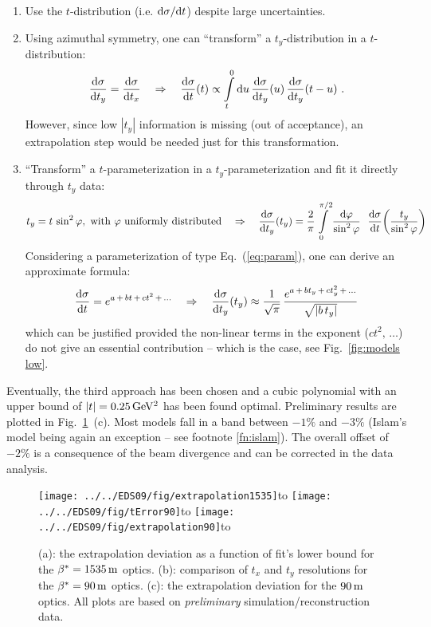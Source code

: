 \documentclass{cimento}
\def\be{\beta}
\def\ph{\varphi}
\def\si{\sigma}
\def\un#1{\,{\rm #1}}
\def\subtitle#1#2{\vbox{\setbox0\hbox{#1}\copy0\hbox to\wd0{\hss#2\hss}}}
\def\d{{\rm d}}
\begin{document}
\begin{enumerate}
\item Use the $t$-distribution (i.e. $\d\si/\d t$) despite large uncertainties.

\item Using azimuthal symmetry, one can ``transform'' a $t_y$-distribution in a $t$-distribution:
$${\d\si\over\d t_y} = {\d\si\over\d t_x} \quad \Rightarrow \quad {\d\si\over\d t}(t) \propto \int\limits_t^0 \d u\, {\d\si\over\d t_y}(u)\, {\d\si\over\d t_y}(t - u)\ .$$
However, since low $|t_y|$ information is missing (out of acceptance), an extrapolation step would be needed just for this transformation.

\item ``Transform'' a $t$-parameterization in a $t_y$-parameterization and fit it directly through $t_y$ data:
$$t_y = t\,\sin^2\ph, \hbox{ with }\ph\hbox{ uniformly distributed} \quad \Rightarrow \quad {\d\si\over\d t_y}(t_y) = {2\over\pi} \int\limits_{0}^{\pi/2} {\d\ph\over\sin^2\ph}\ \ {\d\si\over\d t}\!\left(t_y\over\sin^2\ph\right)$$
Considering a parameterization of type Eq.~(\ref{eq:param}), one can derive an approximate formula:
$${\d\si\over\d t} = e^{a\, +\, bt\, +\, ct^2\, +\, \ldots} \quad\Rightarrow\quad {\d\si\over\d t_y}(t_y) \approx {1\over\sqrt{\pi}}\, {e^{a\, +\, bt_y\, +\, ct_y^2\, +\, \ldots}\over\sqrt{|b\,t_y|}}$$
which can be justified provided the non-linear terms in the exponent ($ct^2,\, \ldots$) do not give an essential contribution -- which is the case, see Fig.~\ref{fig:models low}.
\end{enumerate}

	
Eventually, the third approach has been chosen and a cubic polynomial with an upper bound of $|t| = 0.25\un{GeV^2}$ has been found optimal. Preliminary results are plotted in Fig.~\ref{fig:extrapol}~(c). Most models fall in a band between $-1\%$ and $-3\%$ (Islam's model being again an exception -- see footnote \ref{fn:islam}). The overall offset of $-2\%$ is a consequence of the beam divergence and can be corrected in the data analysis.

\begin{figure}[htb]
\centerline{\hss
	\subtitle{\texttt{[image: ../../EDS09/fig/extrapolation1535]}}{(a)}\hfil
	\subtitle{\texttt{[image: ../../EDS09/fig/tError90]}}{(b)}\hfil
	\subtitle{\texttt{[image: ../../EDS09/fig/extrapolation90]}}{(c)}\hss
}%
\caption{(a): the extrapolation deviation as a function of fit's lower bound for the $\be^* = 1535\un{m}$ optics.
(b): comparison of $t_x$ and $t_y$ resolutions for the $\be^* = 90\un{m}$ optics.
(c): the extrapolation deviation for the $90\un{m}$ optics.
All plots are based on {\em preliminary} simulation/reconstruction data.}%
\label{fig:extrapol}%
\end{figure}
\end{document}
